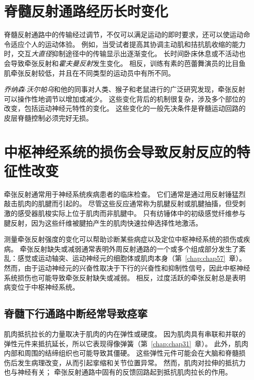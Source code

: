 \section{脊髓反射通路经历长时变化}

脊髓反射通路中的传输经过调节，不仅可以满足运动的即时要求，还可以使运动命令适应个人的运动体验。
例如，当受试者提高其协调主动肌和拮抗肌收缩的能力时，交互\textit{大直径}抑制途径中的传输显示出逐渐变化。
长时间卧床休息或不活动也会导致牵张反射和\textit{霍夫曼反射}发生变化。
相反，训练有素的芭蕾舞演员的比目鱼肌牵张反射较低，并且在不同类型的运动员中有所不同。


\textit{乔纳森$\cdot$沃尔帕乌}和他的同事对人类、猴子和老鼠进行的广泛研究发现，牵张反射可以操作性地调节以增加或减少。
这些变化背后的机制很复杂，涉及多个部位的改变，包括运动神经元特性的变化。
这些变化的一般先决条件是脊髓运动回路的皮层脊髓控制必须完好无损。



\section{中枢神经系统的损伤会导致反射反应的特征性改变}

牵张反射通常用于神经系统疾病患者的临床检查。
它们通常是通过用反射锤猛烈敲击肌肉的肌腱而引起的。
尽管这些反应通常称为肌腱反射或肌腱抽搐，但受刺激的感受器肌梭实际上位于肌肉而非肌腱中。
只有纺锤体中的初级感觉纤维参与腱反射，因为这些纤维被腱拍产生的肌肉快速拉伸选择性地激活。


测量牵张反射强度的变化可以帮助诊断某些病症以及定位中枢神经系统的损伤或疾病。
牵张反射缺失或减弱通常表明外周反射通路的一个或多个组成部分发生了紊乱：感觉或运动轴突、运动神经元的细胞体或肌肉本身（第~\ref{chap:chap57}~章）。
然而，由于运动神经元的兴奋性取决于下行的兴奋性和抑制性信号，因此中枢神经系统损伤也可能导致牵张反射缺失或减弱。
相反，过度活跃的牵张反射总是表明病变位于中枢神经系统。



\subsection{脊髓下行通路中断经常导致痉挛}

肌肉抵抗拉长的力量取决于肌肉的内在弹性或硬度。
因为肌肉具有串联和并联的弹性元件来抵抗延长，所以它表现得像弹簧（第~\ref{chap:chap31}~章）。
此外，肌肉内部和周围的结缔组织也可能导致其僵硬。
这些弹性元件可能会在大脑和脊髓损伤后发生病理改变，从而引起挛缩和关节位置异常。
然而，肌肉对拉伸的抵抗力也与神经有关；
牵张反射通路中固有的反馈回路起到抵抗肌肉拉长的作用。


